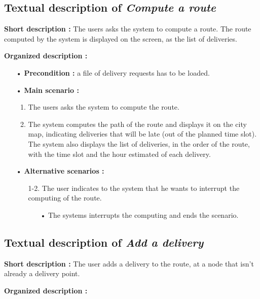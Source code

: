 \documentclass[paper=a4,fontsize=11pt]{report}
\numberwithin{equation}{section}		%
\numberwithin{figure}{section}		%
\numberwithin{table}{section}		%
\renewcommand{\it}[1]{\textit{#1}}
\begin{document}
\subsection{Textual description of \it{Compute a route}}
\label{subsec:textual-description-of-compute-a-route}

\textbf{Short description :} The users asks the system to compute a route. The route computed by the system is displayed on the screen, as the list of deliveries.

\textbf{Organized description :}

\begin{itemize}
  \item[•] \textbf{Precondition :} a file of delivery requests has to be loaded.
  \item[•] \textbf{Main scenario :}
  \begin{enumerate}
    \item The users asks the system to compute the route.
    \item The system computes the path of the route and displays it on the city map, indicating deliveries that will be late (out of the planned time slot). The system also displays the list of deliveries, in the order of the route, with the time slot and the hour estimated of each delivery.
  \end{enumerate}
  \item[•] \textbf{Alternative scenarios :}
  \begin{itemize}
    \item[1-2.] The user indicates to the system that he wants to interrupt the computing of the route.
    \begin{itemize}
      \item[•] The systems interrupts the computing and ends the scenario.
    \end{itemize}
  \end{itemize}
\end{itemize}

\subsection{Textual description of \it{Add a delivery}}
\label{subsec:textual-description-of-add-a-delivery}

\textbf{Short description :} The user adds a delivery to the route, at a node that isn’t already a delivery point.

\textbf{Organized description :}
\end{document}
